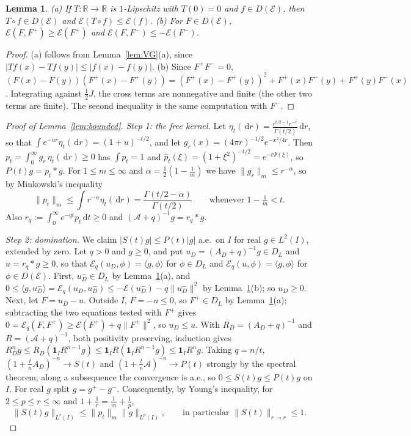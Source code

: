 \documentclass[11pt]{amsart}
\newcommand{\R}{\mathbb{R}}
\newcommand{\E}{\mathcal{E}}
\newcommand{\one}{\mathbf{1}}
\newcommand{\dd}{\,\mathrm{d}}
\newtheorem{lemma}[theorem]{Lemma}
\theoremstyle{definition}
\theoremstyle{remark}
\numberwithin{equation}{section}
\begin{document}
\begin{lemma}\label{lem:contraction}
(a) If $T:\R\to\R$ is $1$-Lipschitz with $T(0)=0$ and $f\in D(\E)$, then $T\circ f\in D(\E)$ and $\E(T\circ f)\le\E(f)$. (b) For $F\in D(\E)$, $\E(F,F^+)\ge\E(F^+)$ and $\E(F,F^-)\le-\E(F^-)$.
\end{lemma}

\begin{proof}
(a) follows from Lemma~\ref{lem:VG}(a), since $|Tf(x)-Tf(y)|\le|f(x)-f(y)|$. (b) Since $F^+F^-=0$, $(F(x)-F(y))(F^+(x)-F^+(y))=(F^+(x)-F^+(y))^2+F^+(x)F^-(y)+F^+(y)F^-(x)$. Integrating against $\frac12J$, the cross terms are nonnegative and finite (the other two terms are finite). The second inequality is the same computation with $F^-$.
\end{proof}

\begin{proof}[Proof of Lemma~\ref{lem:bounded}]
\emph{Step 1: the free kernel.} Let $\eta_t(\dd r)=\frac{r^{t/2-1}e^{-r}}{\Gamma(t/2)}\dd r$, so that $\int e^{-ur}\eta_t(\dd r)=(1+u)^{-t/2}$, and let $g_r(x)=(4\pi r)^{-1/2}e^{-x^2/4r}$. Then $p_t=\int_0^\infty g_r\,\eta_t(\dd r)\ge0$ has $\int p_t=1$ and $\hat p_t(\xi)=(1+\xi^2)^{-t/2}=e^{-t\Psi(\xi)}$, so $P(t)g=p_t*g$. For $1\le m\le\infty$ and $\alpha=\frac12(1-\frac1m)$ we have $\|g_r\|_m\le r^{-\alpha}$, so by Minkowski's inequality
\begin{equation}\label{eq:pt}
\|p_t\|_m\le\int r^{-\alpha}\eta_t(\dd r)=\frac{\Gamma(t/2-\alpha)}{\Gamma(t/2)}\qquad\text{whenever }1-\tfrac1m<t .
\end{equation}
Also $r_q:=\int_0^\infty e^{-qt}p_t\dd t\ge0$ and $(\mathcal A+q)^{-1}g=r_q*g$.

\emph{Step 2: domination.} We claim $|S(t)g|\le P(t)|g|$ a.e.\ on $I$ for real $g\in L^2(I)$, extended by zero. Let $q>0$ and $g\ge0$, and put $u_D=(A_D+q)^{-1}g\in D_L$ and $u=r_q*g\ge0$, so that $\E_q(u_D,\phi)=\langle g,\phi\rangle$ for $\phi\in D_L$ and $\E_q(u,\phi)=\langle g,\phi\rangle$ for $\phi\in D(\E)$. First, $u_D^-\in D_L$ by Lemma~\ref{lem:contraction}(a), and $0\le\langle g,u_D^-\rangle=\E_q(u_D,u_D^-)\le-\E(u_D^-)-q\|u_D^-\|^2$ by Lemma~\ref{lem:contraction}(b); so $u_D\ge0$. Next, let $F=u_D-u$. Outside $I$, $F=-u\le0$, so $F^+\in D_L$ by Lemma~\ref{lem:contraction}(a); subtracting the two equations tested with $F^+$ gives $0=\E_q(F,F^+)\ge\E(F^+)+q\|F^+\|^2$, so $u_D\le u$. With $R_D=(A_D+q)^{-1}$ and $R=(\mathcal A+q)^{-1}$, both positivity preserving, induction gives $R_D^ng\le R_D(\one_IR^{n-1}g)\le\one_IR(\one_IR^{n-1}g)\le\one_IR^ng$. Taking $q=n/t$, $(1+\frac tnA_D)^{-n}\to S(t)$ and $(1+\frac tn\mathcal A)^{-n}\to P(t)$ strongly by the spectral theorem; along a subsequence the convergence is a.e., so $0\le S(t)g\le P(t)g$ on $I$. For real $g$ split $g=g^+-g^-$. Consequently, by Young's inequality, for $2\le p\le r\le\infty$ and $1+\frac1r=\frac1m+\frac1p$,
\begin{equation}\label{eq:smooth}
\|S(t)g\|_{L^r(I)}\le\|p_t\|_m\|g\|_{L^p(I)},\qquad\text{in particular }\|S(t)\|_{r\to r}\le1 .
\end{equation}


\end{proof}
\end{document}
